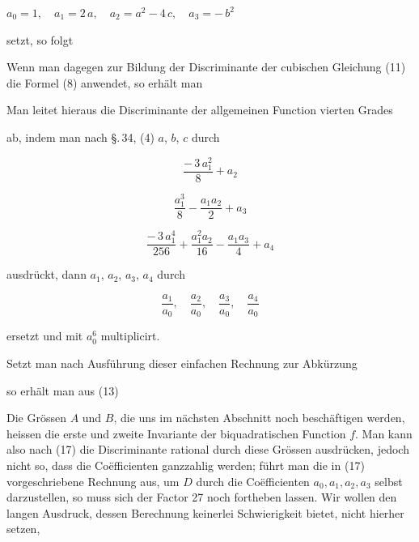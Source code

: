 
$a_0 = 1, \quad a_1 = 2\,a, \quad a_2 = a^2 - 4\,c, \quad a_3 = -\,b^2$

setzt, so folgt

Wenn man dagegen zur Bildung der Discriminante der cubischen Gleichung (11) die Formel (8) anwendet, so erhält man


Man leitet hieraus die Discriminante der allgemeinen Function vierten Grades


ab, indem man nach \S.\,34, (4) $a$, $b$, $c$ durch

\[
\frac{-\,3\,a_1^2}{8} + a_2
\]

\[
\frac{a_1^3}{8} - \frac{a_1 a_2}{2} + a_3
\]

\[
\frac{-\,3\,a_1^4}{256} + \frac{a_1^2 a_2}{16} - \frac{a_1 a_3}{4} + a_4
\]

ausdrückt, dann $a_1$, $a_2$, $a_3$, $a_4$ durch

\[
\frac{a_1}{a_0}, \quad \frac{a_2}{a_0}, \quad \frac{a_3}{a_0}, \quad \frac{a_4}{a_0}
\]

ersetzt und mit $a_0^6$ multiplicirt.

Setzt man nach Ausführung dieser einfachen Rechnung zur Abkürzung



so erhält man aus (13)


Die Grössen $A$ und $B$, die uns im nächsten Abschnitt noch beschäftigen werden, heissen die erste und zweite Invariante der biquadratischen Function $f$. Man kann also nach (17) die Discriminante rational durch diese Grössen ausdrücken, jedoch nicht so, dass die Co\"efficienten ganzzahlig werden; führt man die in (17) vorgeschriebene Rechnung aus, um $D$ durch die Co\"efficienten $a_0, a_1, a_2, a_3$ selbst darzustellen, %
so muss sich der Factor 27 noch fortheben lassen. Wir wollen den langen Ausdruck, dessen Berechnung keinerlei Schwierigkeit bietet, nicht hierher setzen,
